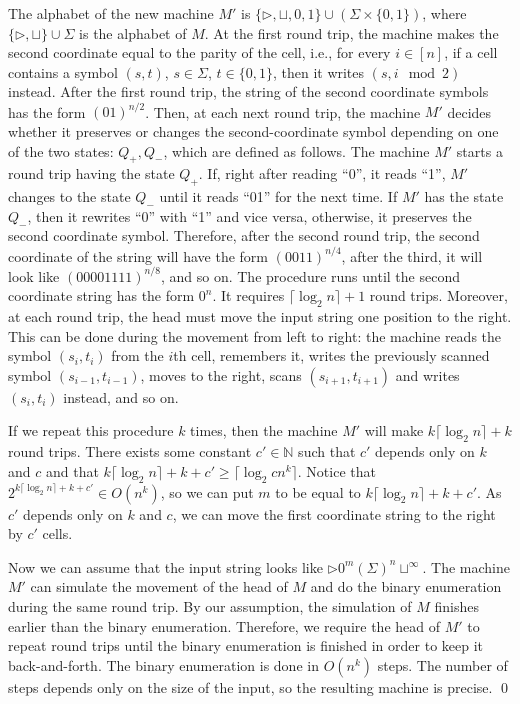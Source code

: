 \documentclass[10pt,a4paper]{amsart}
\theoremstyle{plain}
\theoremstyle{definition}
\numberwithin{equation}{section}
\newcommand{\ie}{i.e.\xspace}  %
\begin{document}
The alphabet of the new machine $M'$ is $\{\triangleright,\sqcup,0,1\}\cup(\Sigma\times\{0,1\})$, where $\{\triangleright,\sqcup\}\cup\Sigma$ is the alphabet of $M$. 
At the first round trip, the machine makes the second coordinate equal to the parity of the cell, \ie, for every $i\in[n]$, if a cell contains a symbol $(s,t)$, $s\in\Sigma$, $t\in\{0,1\}$, then it writes $(s,i \mod 2)$ instead. 
After the first round trip, the string of the second coordinate symbols has the form $(01)^{n/2}$. 
Then, at each next round trip, the machine $M'$ decides whether it preserves or changes the second-coordinate symbol depending on one of the two states: $Q_+, Q_-$, which are defined as follows.
The machine $M'$ starts a round trip having the state $Q_+$.
If, right after reading ``0'', it reads ``1'', $M'$ changes to the state $Q_-$ until it reads ``01'' for the next time.
If $M'$ has the state $Q_-$, then it rewrites ``0'' with ``1'' and vice versa, otherwise, it preserves the second coordinate symbol.
Therefore, after the second round trip, the second coordinate of the string will have the form $(0011)^{n/4}$, after the third, it will look like $(00001111)^{n/8}$, and so on. 
The procedure runs until the second coordinate string has the form $0^n$. 
It requires $\lceil\log_2 n\rceil + 1$ round trips. 
Moreover, at each round trip, the head must move the input string one position to the right. 
This can be done during the movement from left to right: the machine reads the symbol $(s_i,t_i)$ from the $i$th cell, remembers it, writes the previously scanned symbol $(s_{i-1},t_{i-1})$, moves to the right, scans $(s_{i+1},t_{i+1})$ and writes $(s_i,t_i)$ instead, and so on.

If we repeat this procedure $k$ times, then the machine $M'$ will make $k\lceil\log_2 n\rceil + k$ round trips.
There exists some constant $c'\in\mathbb{N}$  such that $c'$ depends only on $k$ and $c$ and that $k\lceil\log_2 n\rceil + k +c' \geq \lceil\log_2 cn^k\rceil$.
Notice that $2^{k\lceil\log_2 n\rceil + k +c'}\in O(n^k)$, so we can put $m$ to be equal to $k\lceil\log_2 n\rceil + k +c'$.
As $c'$ depends only on $k$ and $c$, we can move the first coordinate string to the right by $c'$ cells.

Now we can assume that the input string looks like $\triangleright0^{m}(\Sigma)^n\sqcup^\infty$. The machine $M'$ can simulate the movement of the head of $M$ and do the binary enumeration during the same round trip. By our assumption, the simulation of $M$ finishes earlier than the binary enumeration. Therefore, we require the head of $M'$ to repeat round trips until the binary enumeration is finished in order to keep it back-and-forth. The binary enumeration is done in $O(n^k)$ steps. The number of steps depends only on the size of the input, so the resulting machine is precise.
\qed
\end{document}
